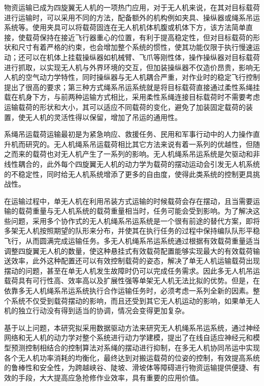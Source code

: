 \documentclass[lang=chs, degree=master, blindreview=false, winfonts=true]{yanputhesis}
\begin{document}
物资运输已成为四旋翼无人机的一项热门应用\cite{cruz2014autonomous}，对于无人机来说，在其对目标载荷进行运输时，可以采用不同的方法，配备额外的机构例如夹具、操纵器或绳系吊运系统等。使用夹具可以将载荷固连在无人机机体机腹或机体下方，该方法简单直接，使载荷保持在接近飞行器重心的位置，有利于提高稳定性，但对目标载荷的形状和尺寸有着严格的约束，也会增加整个系统的惯性，使其功能仅限于执行慢速运动\cite{Khalifa2017}；还可以在机体上挂载操纵器如机械臂、飞爪等刚性体，操作操纵器对目标载荷进行抓取，以实现无人机与外界环境的交互，但加装操纵器不仅造价昂贵，影响无人机的空气动力学特性，同时操纵器与无人机耦合严重，对作业时的稳定飞行控制提出了很高的要求；第三种方式绳系吊运系统就是将目标载荷直接通过柔性系绳挂载在机身下方，与前两种运输方式相比，采用柔性系绳连接目标载荷时不需要考虑运输载荷的形状和大小，其可以适应不同载荷的变化，避免了加装固定载荷的装置，使无人机的灵活性得以保留，增加了吊运的通用性。

系绳吊运载荷运输最初是为紧急响应、救援任务、民用和军事行动中的人力操作直升机而研究的\cite{2020A}。无人机绳系吊运载荷相比其它方法来说有着一系列的优越性，但随之而来的载荷也对无人机产生了一系列的影响。无人机绳系吊运系统是欠驱动和非线性耦合的，此外每个四旋翼无人机的动力学为载荷的摆动运动会引发无人机系统的不稳定性，同时给无人机系统增添了更多的自由度，使得此类系统的控制更具挑战性。

在运输过程中，单无人机在利用吊装方式运输的时候载荷会存在摆动，且当需要运输的载荷重量与无人机系统的载荷重量相当时，任务可能会受到影响。为了解决这些问题，采用多个协作式的无人机绳系吊运系统是一个很有前途的替代方案，即将多架无人机按照期望的队形来分布，并使其在执行任务的过程中保持编队队形平稳飞行，从而圆满完成运输任务。多无人机绳系吊运系统通过根据有效载荷重量适当调整四旋翼无人机的数量，使这种悬挂式有效载荷配置能够实现最大的有效载荷输送效率，此外这种配置还可以有效控制载荷的姿态，解决了单无人机运输载荷出现摆动的问题，甚至在单无人机发生故障时仍可以完成任务需求。因此多无人机吊运载荷具有可行性高、效率高以及扩展性强等单架无人机无法比拟的优势。但是，在依靠多无人机绳系吊运系统执行合作运输任务时，必须考虑一系列全新的因素。整个系统不仅受到载荷摆动的影响，而且还受到其它无人机运动的影响，如果单无人机的独立行动没有得到适当的协调，情况会变得更加复杂。

基于以上问题，本研究拟采用数据驱动方法来研究无人机绳系吊运系统，通过神经网络和无人机的动力学对整个系统进行动力学建模，提出了在线自适应神经元和模型预测控制相结合的控制算法对系绳的摆动进行抑制，在多无人机协同吊运中实现各个无人机功率消耗的均衡化，最终达到对搬运载荷的位姿的控制，有效提高系统的鲁棒性和安全性，为跨越峡谷、陡坡、滑坡体等障碍进行物资运输提供便捷、有效的手段，大大提高应急抢修作业效率，具有重要的应用价值。
\end{document}
